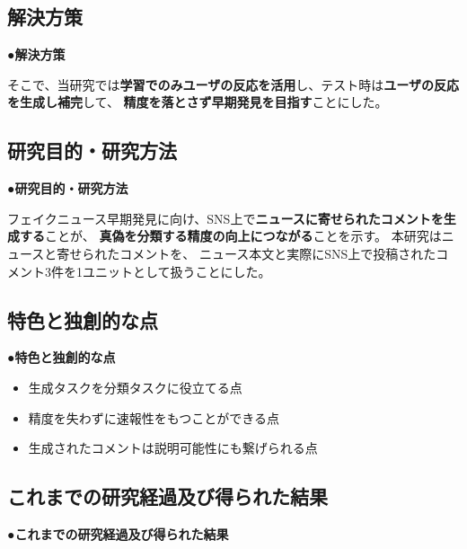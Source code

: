 {	\subsection{解決方策}
	●\textbf{解決方策}

	そこで、当研究では\textbf{学習でのみユーザの反応を活用}し、テスト時は\textbf{ユーザの反応を生成し補完}して、
	\textbf{精度を落とさず早期発見を目指す}ことにした。

	\subsection{研究目的・研究方法}
	●\textbf{研究目的・研究方法}

	フェイクニュース早期発見に向け、SNS上で\textbf{ニュースに寄せられたコメントを生成する}ことが、
	\textbf{真偽を分類する精度の向上につながる}ことを示す。
	本研究はニュースと寄せられたコメントを、
	ニュース本文と実際にSNS上で投稿されたコメント3件を1ユニットとして扱うことにした。
	
	\subsection{特色と独創的な点}
	●\textbf{特色と独創的な点}
	
	\begin{itemize}
		\item 生成タスクを分類タスクに役立てる点
		\item 精度を失わずに速報性をもつことができる点
		\item 生成されたコメントは説明可能性にも繋げられる点
	\end{itemize}


	\subsection{これまでの研究経過及び得られた結果}
	●\textbf{これまでの研究経過及び得られた結果}


	
	
}

